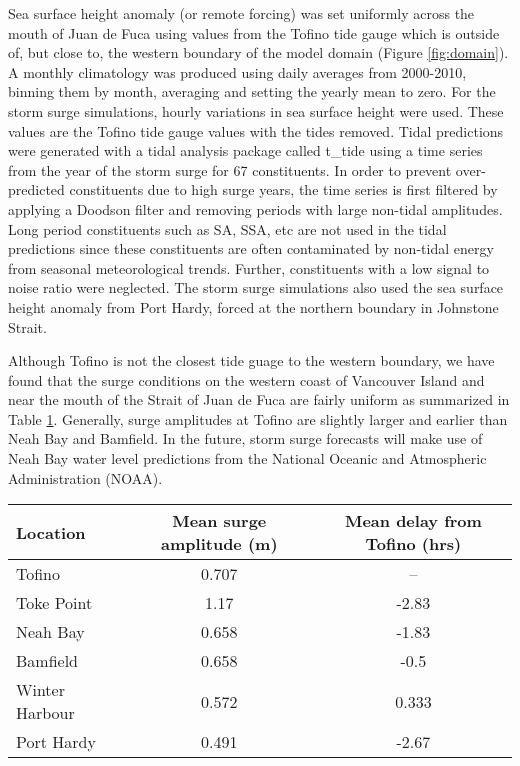 \documentclass[letterpaper]{tATO2e}
\begin{document}
Sea surface height anomaly (or remote forcing) was set uniformly across the mouth of Juan de Fuca using values from the Tofino tide gauge \citep{DFOObservations} which is outside of, but close to, the western boundary of the model domain (Figure \ref{fig:domain}).  A monthly climatology was produced using daily averages from 2000-2010, binning them by month, averaging and setting the yearly mean to zero.  For the storm surge simulations, hourly variations in sea surface height were used.  These values are the Tofino tide gauge values with the tides removed. {\color{red}Tidal predictions were generated with a tidal analysis package called t\_tide \citep{pawlowicz2002classical} using a time series from the year of the storm surge for 67 constituents. In order to prevent over-predicted constituents due to high surge years, the time series is first filtered by applying a Doodson filter \citep{parker2007NOAA} and removing periods with large non-tidal amplitudes. Long period constituents such as SA, SSA, etc are not used in the tidal predictions since these constituents are often contaminated by non-tidal energy from seasonal meteorological trends. Further, constituents with a low signal to noise ratio were neglected. } The storm surge simulations also used the sea surface height anomaly from Port Hardy, forced at the northern boundary in Johnstone Strait. 

{\color{red} Although Tofino is not the closest tide guage to the western boundary, we have found that the surge conditions on the western coast of Vancouver Island and near the mouth of the Strait of Juan de Fuca are fairly uniform as summarized in Table \ref{tab:pacificsurge}. Generally, surge amplitudes at Tofino are slightly larger and earlier than Neah Bay and Bamfield. In the future, storm surge forecasts will make use of Neah Bay water level predictions from the National Oceanic and Atmospheric Administration (NOAA).}

\begin{table}[h]
\centering 
{} 
{\begin{tabular}{|l |c | c|}
\hline 
Location & Mean surge amplitude (m) & Mean delay from Tofino (hrs) \\
\hline
Tofino  & 0.707 & -- \\
Toke Point & 1.17 & -2.83 \\
Neah Bay & 0.658 & -1.83 \\
Bamfield & 0.658 & -0.5 \\
Winter Harbour & 0.572 & 0.333 \\
Port Hardy & 0.491 & -2.67\\
\hline
\end{tabular}}
\label{tab:pacificsurge}
\end{table}
\end{document}
